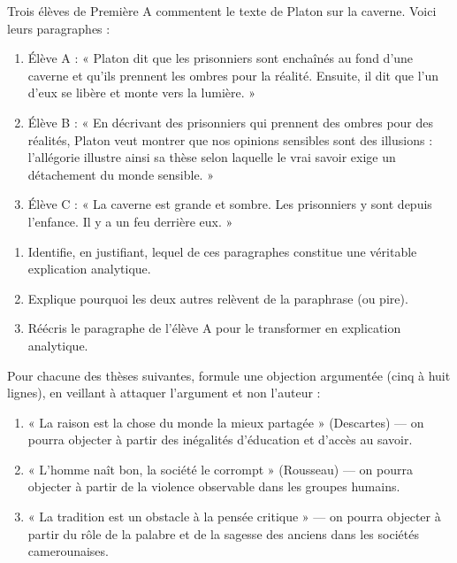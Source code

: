 \documentclass[11pt]{article}
\newcommand{\cle}[1]{{\popxbold\color{popdark}#1}}
\begin{document}
\begin{exercice}
Trois élèves de Première A commentent le texte de Platon sur la caverne. Voici leurs paragraphes :
\begin{enumerate}
\item Élève A : « Platon dit que les prisonniers sont enchaînés au fond d'une caverne et qu'ils prennent les ombres pour la réalité. Ensuite, il dit que l'un d'eux se libère et monte vers la lumière. »
\item Élève B : « En décrivant des prisonniers qui prennent des ombres pour des réalités, Platon veut montrer que nos opinions sensibles sont des illusions : l'allégorie illustre ainsi sa thèse selon laquelle le vrai savoir exige un détachement du monde sensible. »
\item Élève C : « La caverne est grande et sombre. Les prisonniers y sont depuis l'enfance. Il y a un feu derrière eux. »
\end{enumerate}
\begin{enumerate}
\item Identifie, en justifiant, lequel de ces paragraphes constitue une véritable explication analytique.
\item Explique pourquoi les deux autres relèvent de la paraphrase (ou pire).
\item Réécris le paragraphe de l'élève A pour le transformer en explication analytique.
\end{enumerate}
\end{exercice}

\begin{exercice}
Pour chacune des thèses suivantes, formule une \cle{objection} argumentée (cinq à huit lignes), en veillant à attaquer l'argument et non l'auteur :
\begin{enumerate}
\item « La raison est la chose du monde la mieux partagée » (Descartes) — on pourra objecter à partir des inégalités d'éducation et d'accès au savoir.
\item « L'homme naît bon, la société le corrompt » (Rousseau) — on pourra objecter à partir de la violence observable dans les groupes humains.
\item « La tradition est un obstacle à la pensée critique » — on pourra objecter à partir du rôle de la palabre et de la sagesse des anciens dans les sociétés camerounaises.
\end{enumerate}
\end{exercice}
\end{document}
